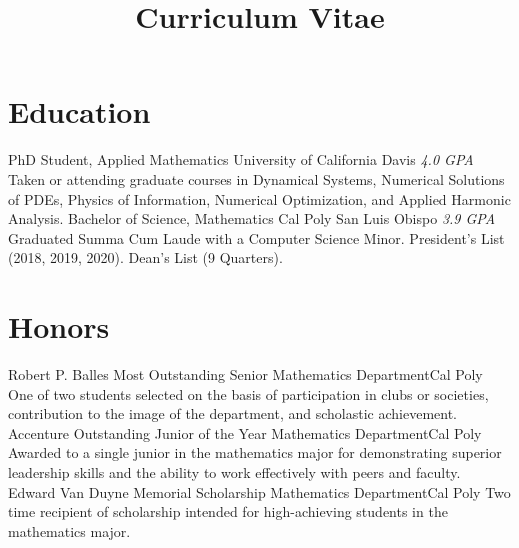 \documentclass[letterpaper, 11pt, sans]{moderncv}
\title{Curriculum Vitae}
\begin{document}
\makecvtitle

\section{Education}
        {PhD Student, Applied Mathematics}
        {University of California}
        {Davis}
        {\textit{4.0 GPA}}
        {
            Taken or attending graduate courses in Dynamical Systems, Numerical
            Solutions of PDEs, Physics of Information, Numerical Optimization,
            and Applied Harmonic Analysis.
        }
        {Bachelor of Science, Mathematics}
        {Cal Poly}
        {San Luis Obispo}
        {\textit{3.9 GPA}}
        {
            Graduated Summa Cum Laude with a Computer Science Minor.\newline
            President's List (2018, 2019, 2020). Dean's List (9 Quarters).
        }

\section{Honors}
        {Robert P. Balles Most Outstanding Senior}
        {Mathematics Department}{Cal Poly}{}
        {One of two students selected on the basis of participation in clubs or societies, contribution to the image of the department, and scholastic achievement.}
        {Accenture Outstanding Junior of the Year}
        {Mathematics Department}{Cal Poly}{}
        {Awarded to a single junior in the mathematics major for demonstrating superior leadership skills and the ability to work effectively with peers and faculty.}
        {Edward Van Duyne Memorial Scholarship}
        {Mathematics Department}{Cal Poly}{}
        {Two time recipient of scholarship intended for high-achieving students in the mathematics major.}
\end{document}
